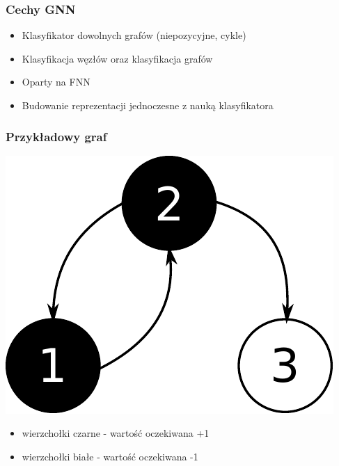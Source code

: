 \documentclass{beamer}
\begin{document}
\begin{frame}
\frametitle{Cechy GNN}
\begin{itemize}
	\item Klasyfikator dowolnych grafów (niepozycyjne, cykle)
	\item Klasyfikacja węzłów oraz klasyfikacja grafów
	\item Oparty na FNN
	\item Budowanie reprezentacji jednoczesne z nauką klasyfikatora
\end{itemize}
\end{frame}

\begin{frame}
\frametitle{Przykładowy graf}
\begin{center}
	\includegraphics[scale=0.6]{img/graph_classes}
\end{center}
\begin{itemize}
	\item wierzchołki czarne - wartość oczekiwana +1
	\item wierzchołki białe - wartość oczekiwana -1
\end{itemize}
\end{frame}
\end{document}
